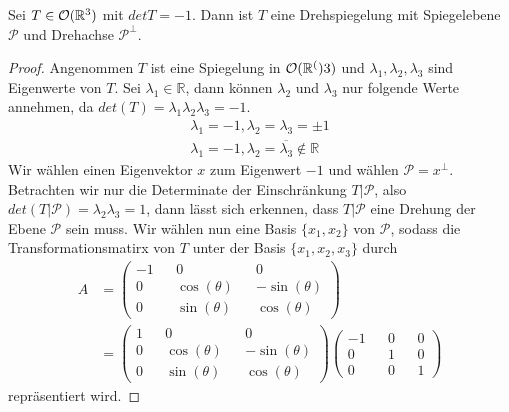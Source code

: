 \begin{theorem}
 Sei $T\in{\mathcal{O}(\mathbb{R}^3)}$ mit $det T = -1$. Dann ist $T$ eine Drehspiegelung mit Spiegelebene $\mathcal{P}$ und Drehachse $\mathcal{P}^{\perp}$.
\end{theorem}
\begin{proof}
 Angenommen $T$ ist eine Spiegelung in ${\mathcal{O}(\mathbb{R}^()}3)$ und $\lambda_1,\lambda_2,\lambda_3$ sind Eigenwerte von $T$. Sei $\lambda_1 \in \mathbb{R}$, dann können $\lambda_2$ und $\lambda_3$ nur folgende Werte annehmen, da $det(T)=\lambda_1\lambda_2\lambda_3=-1$.
 \setcounter{equation}{0}
 \begin{align}
  \lambda_1=-1, \lambda_2=\lambda_3=\pm1 \\
  \lambda_1=-1, \lambda_2=\overline{\lambda_3}\notin \mathbb{R}
 \end{align}
 Wir wählen einen Eigenvektor $x$ zum Eigenwert $-1$ und wählen $\mathcal{P}=x^{\perp}$. Betrachten wir nur die Determinate der Einschränkung $T|\mathcal{P}$, also $det(T|\mathcal{P})=\lambda_2\lambda_3=1$, dann lässt sich erkennen, dass $T|\mathcal{P}$ eine Drehung der Ebene $\mathcal{P}$ sein muss. Wir wählen nun eine Basis $\{x_1,x_2\}$ von $\mathcal{P}$, sodass die Transformationsmatirx von $T$ unter der Basis $\{x_1,x_2,x_3\}$ durch \begin{align*}
  A&=
\begin{pmatrix}
        -1 && 0 && 0 \\
        0 && \cos(\theta) && -\sin(\theta) \\
        0 && \sin(\theta) && \cos(\theta)
       \end{pmatrix} \\ &=
       \begin{pmatrix}
        1 && 0 && 0 \\
        0 && \cos(\theta) && -\sin(\theta) \\
        0 && \sin(\theta) && \cos(\theta)
       \end{pmatrix} 
       \begin{pmatrix}
        -1 && 0 && 0 \\
        0 && 1 && 0 \\
        0 && 0 && 1
       \end{pmatrix}
 \end{align*}
repräsentiert wird.
\end{proof}



